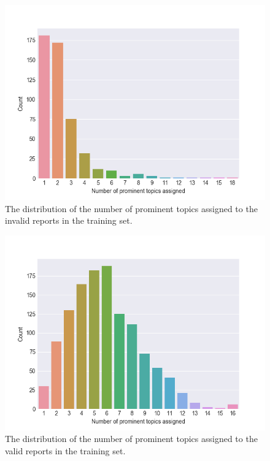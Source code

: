 \begin{figure}[h!]
    \centering
    \includegraphics[scale=0.9]{figures/invalid_reports_prominent_topics_count_histogram}
    \caption{The distribution of the number of prominent topics assigned to the invalid reports in the training set.}
    \label{fig:invalid-reports-prominent-topic-count}
\end{figure}

\begin{figure}[h!]
    \centering
    \includegraphics[scale=0.9]{figures/valid_reports_prominent_topics_count_histogram}
    \caption{The distribution of the number of prominent topics assigned to the valid reports in the training set.}
    \label{fig:valid-reports-prominent-topic-count}
\end{figure}

